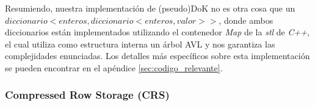 \par Resumiendo, nuestra implementaci\'on de (pseudo)DoK no es otra cosa que un
$diccionario< enteros,diccionario<enteros,valor>>$, donde ambos diccionarios
est\'an implementados utilizando el contenedor \emph{Map} de la \emph{stl} de
\emph{C++}, el cual utiliza como estructura interna un \'arbol AVL y nos
garantiza las complejidades enunciadas\cite{stl_map}. Los detalles m\'as
espec\'ificos sobre esta implementaci\'on se pueden encontrar en el ap\'endice
\ref{sec:codigo_relevante}.

\subsubsection{Compressed Row Storage (CRS)}
\par
